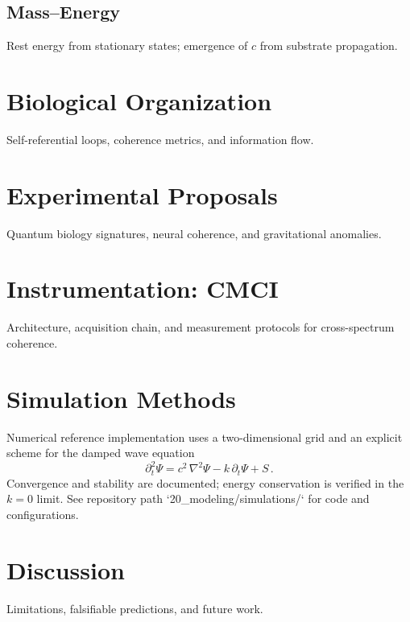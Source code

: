 \documentclass[12pt]{article}
\begin{document}
\subsection{Mass--Energy}
Rest energy from stationary states; emergence of $c$ from substrate propagation.

\section{Biological Organization}
Self-referential loops, coherence metrics, and information flow.

\section{Experimental Proposals}
Quantum biology signatures, neural coherence, and gravitational anomalies.

\section{Instrumentation: CMCI}
Architecture, acquisition chain, and measurement protocols for cross-spectrum coherence.

\section{Simulation Methods}
Numerical reference implementation uses a two-dimensional grid and an explicit scheme for the damped wave equation
\begin{equation}
  \partial_t^2 \Psi = c^2\,\nabla^2\Psi - k\,\partial_t\Psi + S\, .
\end{equation}
Convergence and stability are documented; energy conservation is verified in the $k{=}0$ limit. See repository path `20_modeling/simulations/` for code and configurations.

\section{Discussion}
Limitations, falsifiable predictions, and future work.

\printbibliography
\end{document}
